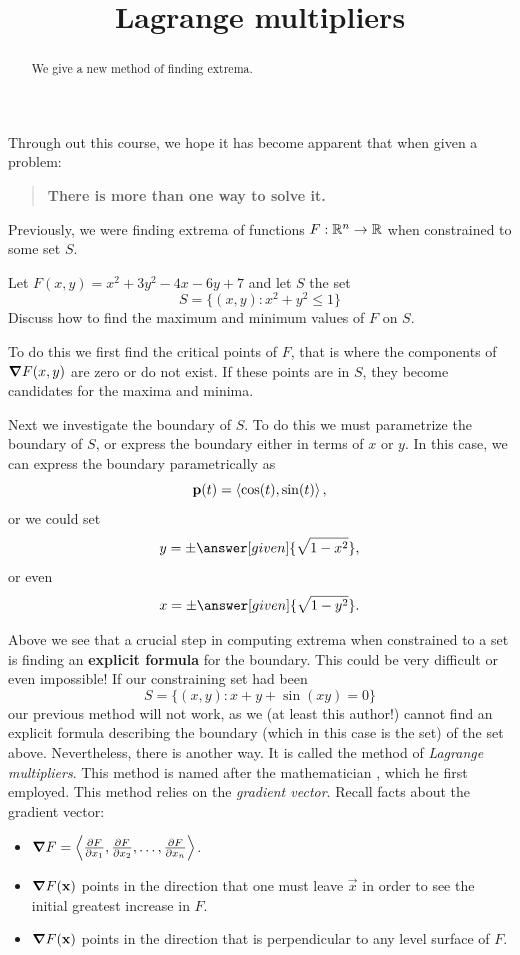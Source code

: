 \documentclass{ximera}
\title[Dig-In:]{Lagrange multipliers}
\begin{document}
\begin{abstract}
  We give a new method of finding extrema. 
\end{abstract}
\maketitle

Through out this course, we hope it has become apparent that when
given a problem:
\begin{quote}
  \textbf{There is more than one way to solve it.}
\end{quote}
Previously, we were finding extrema of functions $F:\R^n\to\R$ when
constrained to some set $S$.

\begin{example}
  Let $F(x,y) = x^2+3y^2-4x-6y+7$ and let $S$ the set
  \[
  S = \{(x,y):x^2 + y^2 \le 1\}
  \]
  Discuss how to find the maximum and minimum values of $F$ on $S$.
  \begin{explanation}
    To do this we first find the critical points of $F$, that is where
    the components of $\grad F(x,y)$ are zero or do not exist. If
    these points are in $S$, they become candidates for the maxima and
    minima.

    Next we investigate the boundary of $S$. To do this we must
    parametrize the boundary of $S$, or express the boundary either in
    terms of $x$ or $y$. In this case, we can express the boundary
    parametrically as
    \[
    \vec{p}(t) = \vector{\cos(t),\sin(t)},
    \]
    or we could set
    \[
    y = \pm \answer[given]{\sqrt{1-x^2}},
    \]
    or even
    \[
    x = \pm \answer[given]{\sqrt{1-y^2}}.
    \]
  \end{explanation}
\end{example}

Above we see that a crucial step in computing extrema when constrained
to a set is finding an \textbf{explicit formula} for the boundary. This
could be very difficult or even impossible! If our constraining set had been
\[
S = \{(x,y): x+y+\sin(xy) =0\}
\]
our previous method will not work, as we (at least this author!)
cannot find an explicit formula describing the boundary (which in this
case is the set) of the set above. Nevertheless, there is another
way. It is called the method of \textit{Lagrange multipliers}. This
method is named after the mathematician , which
he first employed. This method relies on the \textit{gradient
  vector}. Recall facts about the gradient vector:
\begin{itemize}
\item $\grad F = \vector{\pp[F]{x_1},\pp[F]{x_2},\dots,\pp[F]{x_n}}$.
\item $\grad F(\vec{x})$ points in the direction that one must leave
  $\vec{x}$ in order to see the initial greatest increase in $F$.
\item $\grad F(\vec{x})$ points in the direction that is perpendicular
  to any level surface of $F$.
\end{itemize}
\end{document}
